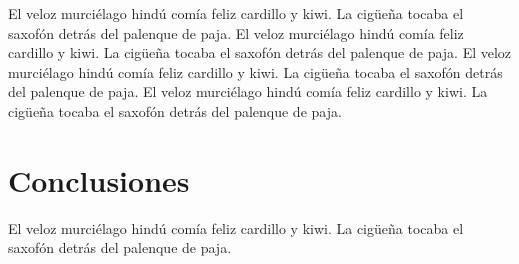 \documentclass[a4paper,11pt,oneside]{article}
\begin{document}
El veloz murciélago hindú comía feliz cardillo y kiwi. La cigüeña tocaba el
saxofón detrás del palenque de paja.
El veloz murciélago hindú comía feliz cardillo y kiwi. La cigüeña tocaba el
saxofón detrás del palenque de paja.
El veloz murciélago hindú comía feliz cardillo y kiwi. La cigüeña tocaba el
saxofón detrás del palenque de paja.
El veloz murciélago hindú comía feliz cardillo y kiwi. La cigüeña tocaba el
saxofón detrás del palenque de paja.

\section*{Conclusiones}

El veloz murciélago hindú comía feliz cardillo y kiwi. La cigüeña tocaba el
saxofón detrás del palenque de paja.
\end{document}
